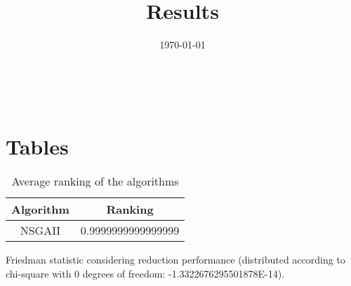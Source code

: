 \documentclass{article}
\title{Results}
\author{}
\date{\today}
\begin{document}
\oddsidemargin 0in \topmargin 0in\maketitle
\
\section{Tables}
\begin{table}[!htp]
\centering
\caption{Average ranking of the algorithms}
\begin{tabular}{c|c}
Algorithm&Ranking\\
\hline
NSGAII&0.9999999999999999\\
\end{tabular}
\end{table}


Friedman statistic considering reduction performance (distributed according to chi-square with 0 degrees of freedom: -1.3322676295501878E-14).
\end{document}
